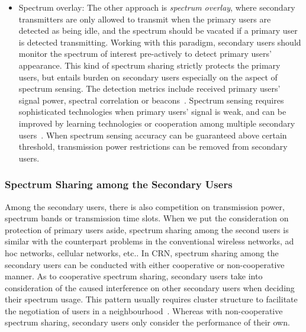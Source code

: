 \begin{itemize}
\item \label{overlay} Spectrum overlay:
The other approach is \textit{spectrum overlay}, where secondary transmitters are only allowed to transmit when the primary users are detected as being idle, and the spectrum should be vacated if a primary user is detected transmitting.
Working with this paradigm, secondary users should monitor the spectrum of interest pre-actively to detect primary users' appearance.
This kind of spectrum sharing strictly protects the primary users, but entails burden on secondary users especially on the aspect of spectrum sensing.
The detection metrics include received primary users' signal power, spectral correlation or beacons~\cite{crnsensing_09}.
Spectrum sensing requires sophisticated technologies when primary users' signal is weak, and can be improved by learning technologies or cooperation among multiple secondary users~\cite{coorperativeSensing_Akyildiz11}.
When spectrum sensing accuracy can be guaranteed above certain threshold, transmission power restrictions can be removed from  secondary users.


\end{itemize}



\subsubsection{Spectrum Sharing among the Secondary Users}
Among the secondary users, there is also competition on transmission power, spectrum bands or transmission time slots.
When we put the consideration on protection of primary users aside, spectrum sharing among the second users is similar with the counterpart problems in the conventional wireless networks, \ie ad hoc networks, cellular networks, etc..
In CRN, spectrum sharing among the secondary users can be conducted with either cooperative or non-cooperative manner.
As to cooperative spectrum sharing, secondary users take into consideration of the caused interference on other secondary users when deciding their spectrum usage.
This pattern usually requires cluster structure to facilitate the negotiation of users in a neighbourhood~\cite{Chen07}.
Whereas with non-cooperative spectrum sharing, secondary users only consider the performance of their own.








